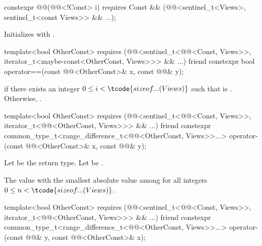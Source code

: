 \begin{itemdecl}
constexpr @@(@@<!Const> i)
  requires Const && (@@<sentinel_t<Views>, sentinel_t<const Views>> && ...);
\end{itemdecl}

\begin{itemdescr}
\pnum
\effects
Initializes  with .
\end{itemdescr}

\begin{itemdecl}
template<bool OtherConst>
  requires (@@<sentinel_t<@@<Const, Views>>,
                         iterator_t<maybe-const<OtherConst, Views>>> && ...)
friend constexpr bool operator==(const @@<OtherConst>& x, const @@& y);
\end{itemdecl}

\begin{itemdescr}
\pnum
\returns
{} if there exists an integer $0 \leq i < \tcode{sizeof...(Views)}$
such that  is .
Otherwise, .
\end{itemdescr}

\begin{itemdecl}
template<bool OtherConst>
  requires (@@<sentinel_t<@@<Const, Views>>,
                               iterator_t<@@<OtherConst, Views>>> && ...)
friend constexpr common_type_t<range_difference_t<@@<OtherConst, Views>>...>
  operator-(const @@<OtherConst>& x, const @@& y);
\end{itemdecl}

\begin{itemdescr}
\pnum
Let  be the return type.
Let  be
.

\pnum
\returns
The value with the smallest absolute value among 
for all integers $0 \leq n < \tcode{sizeof...(Views)}$.
\end{itemdescr}

\begin{itemdecl}
template<bool OtherConst>
  requires (@@<sentinel_t<@@<Const, Views>>,
                               iterator_t<@@<OtherConst, Views>>> && ...)
friend constexpr common_type_t<range_difference_t<@@<OtherConst, Views>>...>
  operator-(const @@& y, const @@<OtherConst>& x);
\end{itemdecl}

